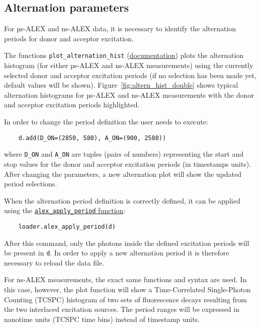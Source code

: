 \subsection{Alternation parameters}
\label{sec:alternation}

For µs-ALEX and ns-ALEX data, it is necessary to identify the
alternation periods for donor and acceptor excitation.

The functions
\verb|plot_alternation_hist| (\href{http://fretbursts.readthedocs.org/en/latest/plots.html#fretbursts.burst\_plot.plot\_alternation\_hist}{documentation})
plots the alternation histogram (for either µs-ALEX and ns-ALEX measurements)
using the currently selected donor and acceptor excitation periods
(if no selection has been made yet, default values will be shown).
Figure~\ref{fig:altern_hist_double} shows typical alternation histograms for
µs-ALEX and ns-ALEX measurements with the donor and acceptor excitation periods highlighted.

In order to change the period definition the user needs to execute:

\begin{verbatim}
    d.add(D_ON=(2850, 580), A_ON=(900, 2580))
\end{verbatim}

where \verb|D_ON| and \verb|A_ON| are tuples (pairs of numbers) representing
the start and stop values for the donor and acceptor excitation periods
(in timestamps units).
After changing the parameters, a new alternation plot will show the updated period selections.

When the alternation period definition is correctly defined, it can
be applied using the
\href{http://fretbursts.readthedocs.org/en/latest/loader.html#fretbursts.loader.alex_apply_period}{\texttt{alex\_apply\_period} function}:

\begin{verbatim}
    loader.alex_apply_period(d)
\end{verbatim}

After this command, only the photons inside the defined excitation periods
will be present in \verb|d|.  In order to apply a new alternation period
it is therefore necessary to reload the data file.

For ns-ALEX measurements, the exact same functions and syntax are used.
In this case, however, the plot function will show a Time-Correlated Single-Photon Counting
(TCSPC) histogram of two sets of fluorescence decays resulting from the two interlaced
excitation sources. The period ranges will be expressed in nanotime units (TCSPC time bins)
instead of timestamp units.
